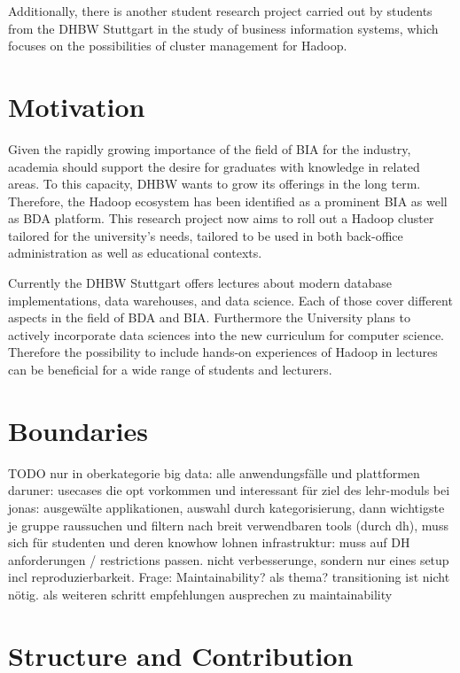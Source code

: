 Additionally, there is another student research project carried out by students from the \ac{DHBW} Stuttgart in the study of business information systems, 
which focuses on the possibilities of cluster management for Hadoop. \autocite{wi2018managementsystems} 

\section{Motivation}
\label{sec:intro:motivation}

Given the rapidly growing importance of the field of \ac{BIA} for the industry, academia
should support the desire for graduates with knowledge in related areas. To this capacity,
\ac{DHBW} wants to grow its offerings in the long term. Therefore, the Hadoop ecosystem has
been identified as a prominent \ac{BIA} as well as \ac{BDA} platform. This research project now
aims to roll out a Hadoop cluster tailored for the university’s needs, tailored to be used in
both back-office administration as well as educational contexts.

Currently the \ac{DHBW} Stuttgart offers lectures about modern database implementations, 
data warehouses, and data science. Each of those cover different aspects in the field of \ac{BDA} and \ac{BIA}. Furthermore the University plans to actively incorporate data sciences into the new curriculum for computer science.
Therefore the possibility to include hands-on experiences of Hadoop in lectures can be beneficial for a wide range of students and lecturers.

\section{Boundaries}
\label{sec:intro:boundaries}

TODO nur in oberkategorie big data: alle anwendungsfälle und plattformen
daruner: usecases die opt vorkommen und interessant für ziel des lehr-moduls
bei jonas: ausgewälte applikationen,
auswahl durch kategorisierung, dann wichtigste je gruppe raussuchen und filtern nach breit verwendbaren tools (durch dh), muss sich für studenten und deren knowhow lohnen
infrastruktur: muss auf DH anforderungen / restrictions passen.
nicht verbesserunge, sondern nur eines setup incl reproduzierbarkeit.
Frage: Maintainability? als thema? transitioning ist nicht nötig.
als weiteren schritt empfehlungen ausprechen zu maintainability

\section{Structure and Contribution}
\label{sec:intro:structure}

